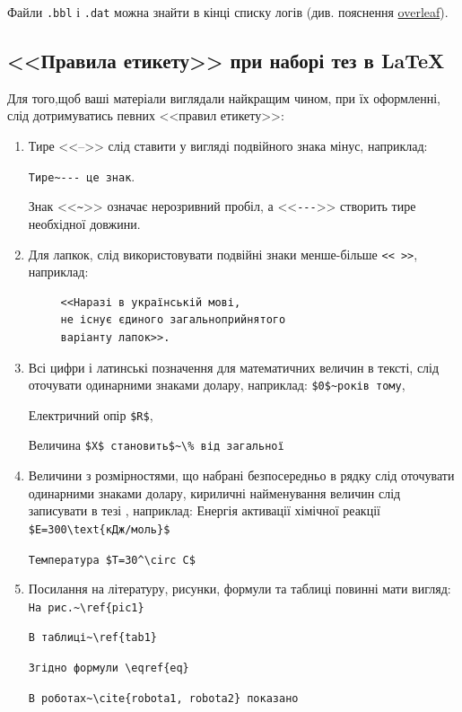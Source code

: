 \documentclass[]{iptconf}
\begin{document}
Файли \texttt{.bbl} і \texttt{.dat} можна знайти в кінці списку логів (див. пояснення  \href{https://www.overleaf.com/help/207-how-do-i-download-the-aux-and-the-bbl-files-my-publisher-asked-me-to-include-them-in-my-submission#.VvMwEnpCh2M}{overleaf}).





\subsection{<<Правила етикету>> при наборі тез в \LaTeX}





Для того,щоб ваші матеріали виглядали найкращим чином, при їх оформленні, слід дотримуватись певних <<правил етикету>>:

\begin{enumerate}
	\item Тире <<-->> слід ставити у вигляді подвійного знака мінус, наприклад:

	      \verb|Тире~--- це знак|.

	      Знак <<\verb|~|>> означає нерозривний пробіл, а <<\verb|---|>> створить тире необхідної довжини.

	\item Для лапкок, слід використовувати подвійні знаки менше-більше \verb|<< >>|, наприклад:
	      \begin{verbatim}
     <<Наразі в українській мові,
     не існує єдиного загальноприйнятого
     варіанту лапок>>.
     \end{verbatim}

	\item Всі цифри і латинські позначення для математичних величин в тексті, слід оточувати одинарними знаками долару, наприклад:
	      \verb|$0$~років тому|,

	      Електричний опір \verb|$R$|,

	      Величина \verb|$X$ становить$~\% від загальної|

	\item Величини з розмірностями, що набрані безпосередньо в рядку слід оточувати одинарними знаками долару, кириличні найменування величин слід записувати в тезі \string\text, наприклад:
	      Енергія активації хімічної реакції \verb|$E=300\text{кДж/моль}$|

	      \verb|Температура $T=30^\circ C$|

	\item Посилання на літературу, рисунки, формули та таблиці повинні мати вигляд:
	      \verb|На рис.~\ref{pic1}|

	      \verb|В таблиці~\ref{tab1}|

	      \verb|Згідно формули \eqref{eq}|

	      \verb|В роботах~\cite{robota1, robota2} показано|
\end{enumerate}
\end{document}
